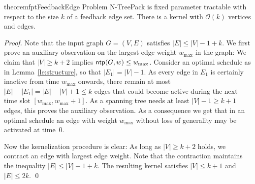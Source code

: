 \documentclass[runningheads]{llncs}
\newcommand{\bigO}{\mathcal{O}}
\newcommand{\xxxNTP}{{\sc N-TreePack}}
\DeclareMathOperator{\ntp}{\text{\sf ntp}}
\begin{document}
\begin{restatable}{theorem}{fptFeedbackEdge}
\label{thm:FPT_feedback_edge_set}
Problem {\xxxNTP} is fixed parameter tractable with respect to the size $k$ of a feedback edge set. 
There is a kernel with $\bigO(k)$ vertices and edges. 
\end{restatable}
\begin{proof}
Note that the input graph $G=(V,E)$ satisfies $|E|\le|V|-1+k$.
We first prove an auxiliary observation on the largest edge weight $w_{\max}$ in the graph:
We claim that $|V|\ge k+2$ implies $\ntp(G,w)\le w_{\max}$. 
Consider an optimal schedule as in Lemma~\ref{le:structure}, so that $|E_1|=|V|-1$.
As every edge in $E_1$ is certainly inactive from time $w_{\max}$ onwards, there remain at most 
$|E|-|E_1|=|E|-|V|+1\le k$ edges that could become active during the next time slot $[w_{\max},w_{\max}+1]$.
As a spanning tree needs at least $|V|-1\ge k+1$ edges, this proves the auxiliary observation.
As a consequence we get that in an optimal schedule an edge with weight $w_{\max}$ without loss 
of generality may be activated at time~$0$.

Now the kernelization procedure is clear:
As long as $|V|\ge k+2$ holds, we contract an edge with largest edge weight.
Note that the contraction maintains the inequality $|E|\le|V|-1+k$.
The resulting kernel satisfies $|V|\le k+1$ and $|E|\le2k$.
\qed
\end{proof}
\end{document}
